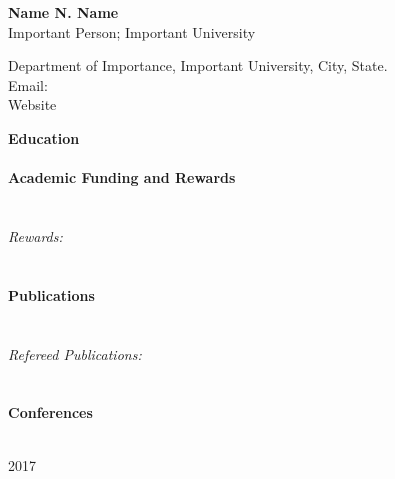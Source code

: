 \documentclass[12pt]{article}
\begin{document}
\begin{flushleft}
\setlength{\parindent}{.5cm}

{\LARGE \textbf{Name N. Name}} \\
\noindent Important Person; Important University\\

\begin{center}
\noindent\makebox[\linewidth]{\rule{\paperwidth}{0.4pt}}

Department of Importance, Important University, City, State.\\
Email:  \\
Website\\

\noindent\makebox[\linewidth]{\rule{\paperwidth}{0.4pt}}
\end{center}

\noindent \textbf{Education}\\

\hfill \\
\noindent \textbf{Academic Funding and Rewards}\\
\hfill \\



\hfill \\
\noindent \textit{Rewards:}\\
\hfill \\



\hfill \\
\noindent \textbf{Publications}\\
\hfill \\



\hfill \\
\noindent \textit{Refereed Publications:}\\
\hfill \\
 
 


\hfill \\
\noindent \textbf{Conferences}\\
\hfill \\

\begin{list}{}{}
\item[2017]


\end{list}
\end{flushleft}
\end{document}
